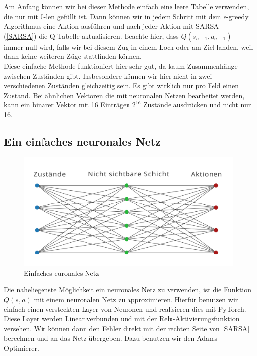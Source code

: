 Am Anfang können wir bei dieser Methode einfach eine leere Tabelle verwenden, die nur mit 0-len gefüllt ist. Dann können wir in jedem Schritt mit dem $\epsilon$-greedy Algorithmus eine Aktion ausführen und nach jeder Aktion mit SARSA (\ref{SARSA}) die Q-Tabelle aktualisieren. Beachte hier, dass $Q(s_{n+1}, a_{n+1})$ immer null wird, falls wir bei diesem Zug in einem Loch oder am Ziel landen, weil dann keine weiteren Züge stattfinden können. \\

Diese einfache Methode funktioniert hier sehr gut, da kaum Zusammenhänge zwischen Zuständen gibt. Insbesondere können wir hier nicht in zwei verschiedenen Zuständen gleichzeitig sein. Es gibt wirklich nur pro Feld einen Zustand. Bei ähnlichen Vektoren die mit neuronalen Netzen bearbeitet werden, kann ein binärer Vektor mit 16 Einträgen $2^{16}$ Zustände ausdrücken und nicht nur 16. \\

\subsection{Ein einfaches neuronales Netz}
\label{subsec:dn}

\begin{figure}[hbt!]
\centering
\includegraphics[width=\textwidth]{Figures/dn.png}
\caption{Einfaches euronales Netz}
\label{police}
\end{figure}

Die naheliegenste Möglichkeit ein neuronales Netz zu verwenden, ist die Funktion $Q(s, a)$ mit einem neuronalen Netz zu approximieren. Hierfür benutzen wir einfach einen versteckten Layer von Neuronen und realisieren dies mit PyTorch. Diese Layer werden Linear verbunden und mit der Relu-Aktivierungsfunktion versehen. Wir können dann den Fehler direkt mit der rechten Seite von \ref{SARSA} berechnen und an das Netz übergeben. Dazu benutzen wir den Adams-Optimierer.

